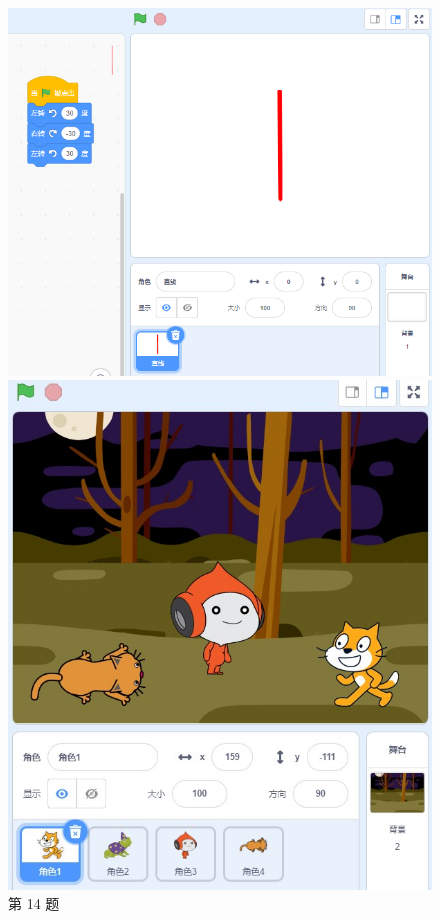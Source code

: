\documentclass[10pt, a4paper]{article}
\begin{document}
\begin{enumerate}
        \begin{figure}[htbp]
            \centering
            \begin{minipage}[t]{.25\textwidth}
                \centering
                \includegraphics[width=\textwidth]{14.png}
                \caption*{第 14 题}
            \end{minipage}
            \begin{minipage}[t]{.25\textwidth}
                \centering
                \includegraphics[width=\textwidth]{15.jpg}

\end{minipage}
\end{figure}
\end{enumerate}
\end{document}
